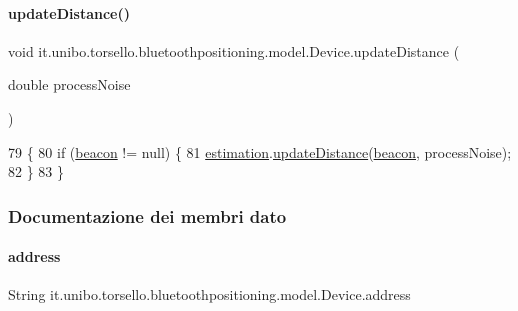 \paragraph{\texorpdfstring{update\+Distance()}{updateDistance()}}
{\footnotesize\ttfamily void it.\+unibo.\+torsello.\+bluetoothpositioning.\+model.\+Device.\+update\+Distance (\begin{DoxyParamCaption}\item[{double}]{process\+Noise }\end{DoxyParamCaption})}


\begin{DoxyCode}
79                                                     \{
80         \textcolor{keywordflow}{if} (\hyperlink{classit_1_1unibo_1_1torsello_1_1bluetoothpositioning_1_1model_1_1Device_ad5ffce680eb2eb38fc6bb8aee234f155_ad5ffce680eb2eb38fc6bb8aee234f155}{beacon} != null) \{
81             \hyperlink{classit_1_1unibo_1_1torsello_1_1bluetoothpositioning_1_1model_1_1Device_ac619c42728cd40f41a5f12fde56b4425_ac619c42728cd40f41a5f12fde56b4425}{estimation}.\hyperlink{classit_1_1unibo_1_1torsello_1_1bluetoothpositioning_1_1distanceEstimation_1_1Estimation_aaf86439861db7facf3f5338ec2fc6cde_aaf86439861db7facf3f5338ec2fc6cde}{updateDistance}(\hyperlink{classit_1_1unibo_1_1torsello_1_1bluetoothpositioning_1_1model_1_1Device_ad5ffce680eb2eb38fc6bb8aee234f155_ad5ffce680eb2eb38fc6bb8aee234f155}{beacon}, processNoise);
82         \}
83     \}
\end{DoxyCode}


\subsubsection{Documentazione dei membri dato}
\hypertarget{classit_1_1unibo_1_1torsello_1_1bluetoothpositioning_1_1model_1_1Device_a0abcf7e0df4ccc96e487c6f9b90b4e13_a0abcf7e0df4ccc96e487c6f9b90b4e13}{}\label{classit_1_1unibo_1_1torsello_1_1bluetoothpositioning_1_1model_1_1Device_a0abcf7e0df4ccc96e487c6f9b90b4e13_a0abcf7e0df4ccc96e487c6f9b90b4e13} 
\paragraph{\texorpdfstring{address}{address}}
{\footnotesize\ttfamily String it.\+unibo.\+torsello.\+bluetoothpositioning.\+model.\+Device.\+address\hspace{0.3cm}{\ttfamily [private]}}


